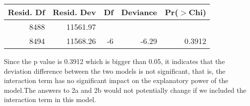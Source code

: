 \documentclass[12pt,letterpaper]{article}
\begin{document}
\begin{enumerate}
\begin{enumerate}
\begin{itemize}
		
		\begin{table}[ht]\centering\begin{tabular}{rrrrr}  \hline Resid. Df & Resid. Dev & Df & Deviance & Pr($>$Chi) \\   \hline8488 & 11561.97 &  &  &  \\   8494 & 11568.26 & -6 & -6.29 & 0.3912 \\    \hline\end{tabular}\end{table}
		Since the p value is 0.3912 which is bigger than 0.05, it indicates that the deviation difference between the two models is not significant, that is, the interaction term has no significant impact on the explanatory power of the model.The answers to 2a and 2b would not potentially change if we included the interaction term in this model.\\
		
		\end{itemize}
	\end{enumerate}
	\end{enumerate}
\end{document}
